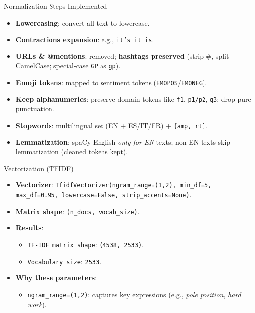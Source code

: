 \documentclass[aspectratio=169]{beamer}
\begin{document}
\begin{frame}{Normalization Steps Implemented}
\small
\begin{itemize}
  \item \textbf{Lowercasing}: convert all text to lowercase.
  \item \textbf{Contractions expansion}: e.g., \texttt{it's \textrightarrow{} it is}.
  \item \textbf{URLs \& @mentions}: removed; \textbf{hashtags preserved} (strip \#, split CamelCase; special-case \texttt{GP} as \texttt{gp}).
  \item \textbf{Emoji tokens}: mapped to sentiment tokens (\texttt{EMOPOS}/\texttt{EMONEG}).
  \item \textbf{Keep alphanumerics}: preserve domain tokens like \texttt{f1}, \texttt{p1/p2}, \texttt{q3}; drop pure punctuation.
  \item \textbf{Stopwords}: multilingual set (EN + ES/IT/FR) + \texttt{\{amp, rt\}}.
  \item \textbf{Lemmatization}: spaCy English \textit{only for EN} texts; non-EN texts skip lemmatization (cleaned tokens kept).
\end{itemize}
\end{frame}

\begin{frame}{Vectorization (TF\textendash IDF)}
\small
\begin{itemize}
  \item \textbf{Vectorizer}: \texttt{TfidfVectorizer(ngram\_range=(1,2), min\_df=5, max\_df=0.95, lowercase=False, strip\_accents=None)}.
  \item \textbf{Matrix shape}: \texttt{(n\_docs, vocab\_size)}.
  \item \textbf{Results}:
    \begin{itemize}
      \item \texttt{TF-IDF matrix shape}: \texttt{(4538, 2533)}.
      \item \texttt{Vocabulary size}: \texttt{2533}.
    \end{itemize}
  \item \textbf{Why these parameters}:
    \begin{itemize}
      \item \texttt{ngram\_range=(1,2)}: captures key expressions (e.g., \textit{pole position}, \textit{hard work}).
    \end{itemize}
\end{itemize}
\end{frame}
\end{document}

